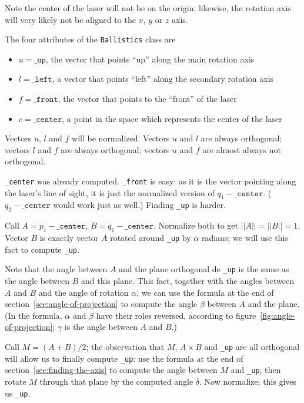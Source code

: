 \documentclass{article}
\newcommand\class[1]{\texttt{#1}}
\newcommand\attribute[1]{\texttt{#1}}
\begin{document}
Note the center of the laser will not be on the origin;
likewise, the rotation axis will very likely not be aligned to
the $x$, $y$ or $z$ axis.

The four attributes of the \class{Ballistics} class are
\begin{itemize}
    \item $u = \attribute{\_up}$,
        the vector that points ``up'' along the main rotation axis
    \item $l = \attribute{\_left}$,
        a vector that points ``left'' along the secondary rotation axis
    \item $f = \attribute{\_front}$,
        the vector that points to the ``front'' of the laser
    \item $c = \attribute{\_center}$,
        a point in the space which represents the center of the laser
\end{itemize}
Vectors $u$, $l$ and $f$ will be normalized.
Vectors $u$ and $l$ are always orthogonal;
vectors $l$ and $f$ are always orthogonal;
vectors $u$ and $f$ are almost always not orthogonal.

\attribute{\_center} was already computed.
\attribute{\_front} is easy: as it is the vector pointing along
the laser's line of sight,
it is just the normalized version of $q_1 - \attribute{\_center}$.
($q_2 - \attribute{\_center}$ would work just as well.)
Finding \attribute{\_up} is harder.

Call $A = p_1 - \attribute{\_center}$, $B = q_1 - \attribute{\_center}$.
Normalize both to get $||A|| = ||B|| = 1$.
Vector $B$ is exactly vector $A$ rotated around \attribute{\_up}
by $\alpha$ radians;
we will use this fact to compute \attribute{\_up}.

Note that the angle between $A$ and the plane orthogonal de \attribute{\_up}
is the same as the angle between $B$ and this plane.
This fact, together with the angles between $A$ and $B$
and the angle of rotation $\alpha$,
we can use the formula at the end of section~\ref{sec:angle-of-projection}
to compute the angle $\beta$ between $A$ and the plane.
(In the formula, $\alpha$ and $\beta$ have their roles reversed,
according to figure~\ref{fig:angle-of-projection};
$\gamma$ is the angle between $A$ and $B$.)

Call $M = (A + B)/2$; the observation that $M$,
$A \times B$ and \attribute{\_up} are all orthogonal
will allow us to finally compute \attribute{\_up}:
use the formula at the end of section~\ref{sec:finding-the-axis}
to compute the angle between $M$ and \attribute{\_up},
then rotate $M$ through that plane by the computed angle $\delta$.
Now normalize;
this gives us \attribute{\_up}.
\end{document}
